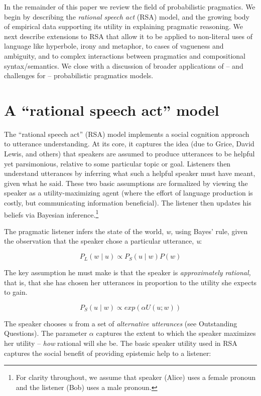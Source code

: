 \documentclass[]{elsarticle}
\begin{document}
In the remainder of this paper we review the field of probabilistic
pragmatics. We begin by describing the \emph{rational speech act}
(RSA) model, and the growing body of empirical data supporting its
utility in explaining pragmatic reasoning. We next describe extensions
to RSA that allow it to be applied to non-literal uses of language like
hyperbole, irony and metaphor, to cases of vagueness and ambiguity, and
to complex interactions between pragmatics and compositional
syntax/semantics. We close with a discussion of broader applications of
-- and challenges for -- probabilistic pragmatics models.

\section{A ``rational speech act'' model}\label{a-rational-speech-act-model}

The ``rational speech act'' (RSA) model implements a social
cognition approach to utterance understanding. At its core, it captures
the idea (due to Grice, David Lewis, and others) that speakers are assumed to
produce utterances to be helpful yet parsimonious, relative to some
particular topic or goal. Listeners then understand utterances by
inferring what such a helpful speaker must have meant, given what he
said. These two basic assumptions are formalized by viewing the speaker
as a utility-maximizing agent (where the effort of language production
is costly, but communicating information beneficial). The listener then
updates his beliefs via Bayesian inference.\footnote{For clarity throughout, we assume that speaker (Alice) uses a female pronoun and the listener (Bob) uses a male pronoun.}

The pragmatic listener infers the state of the world, \emph{w,} using
Bayes' rule, given the observation that the speaker chose a particular
utterance, \emph{u}:

$$P_L(w\mid u) \propto P_S(u \mid w)P(w)$$

The key assumption he must make is that the speaker is
\emph{approximately rational,} that is, that she has chosen her
utterances in proportion to the utility she expects to gain.

$$P_S(u\mid w) \propto exp(\alpha
U(u;w))$$

The speaker chooses $u$ from a set of \emph{alternative utterances}
(see Outstanding Questions). The parameter $\alpha$
captures the extent to which the speaker maximizes her utility --
\emph{how} rational will she be. The basic speaker utility used in RSA
captures the social benefit of providing epistemic help to a listener:
\end{document}

